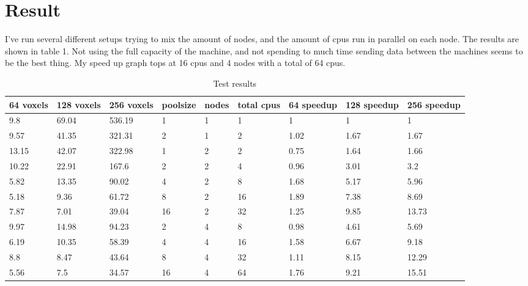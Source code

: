 \documentclass{Article}
\begin{document}
\newpage
\section{Result}
I've run several different setups trying to mix the amount of nodes, and the amount of cpus run in parallel on each node. The results are shown in table 1. Not using the full capacity of the machine, and not spending to much time sending data between the machines seems to be the best thing. My speed up graph tops at 16 cpus and 4 nodes with a total of 64 cpus.
\begin{table}[]
\centering
\caption{Test results}
\label{my-label}
\begin{tabular}{|l|l|l|l|l|l|l|l|l|}
\hline
64 voxels & 128 voxels & 256 voxels & poolsize & nodes & total cpus & 64 speedup & 128 speedup & 256 speedup \\ \hline
9.8       & 69.04      & 536.19     & 1        & 1     & 1          & 1          & 1           & 1           \\ \hline
9.57      & 41.35      & 321.31     & 2        & 1     & 2          & 1.02       & 1.67        & 1.67        \\ \hline
13.15     & 42.07      & 322.98     & 1        & 2     & 2          & 0.75       & 1.64        & 1.66        \\ \hline
10.22     & 22.91      & 167.6      & 2        & 2     & 4          & 0.96       & 3.01        & 3.2         \\ \hline
5.82      & 13.35      & 90.02      & 4        & 2     & 8          & 1.68       & 5.17        & 5.96        \\ \hline
5.18      & 9.36       & 61.72      & 8        & 2     & 16         & 1.89       & 7.38        & 8.69        \\ \hline
7.87      & 7.01       & 39.04      & 16       & 2     & 32         & 1.25       & 9.85        & 13.73       \\ \hline
9.97      & 14.98      & 94.23      & 2        & 4     & 8          & 0.98       & 4.61        & 5.69        \\ \hline
6.19      & 10.35      & 58.39      & 4        & 4     & 16         & 1.58       & 6.67        & 9.18        \\ \hline
8.8       & 8.47       & 43.64      & 8        & 4     & 32         & 1.11       & 8.15        & 12.29       \\ \hline
5.56      & 7.5        & 34.57      & 16       & 4     & 64         & 1.76       & 9.21        & 15.51       \\ \hline

\end{tabular}
\end{table}
\end{document}
